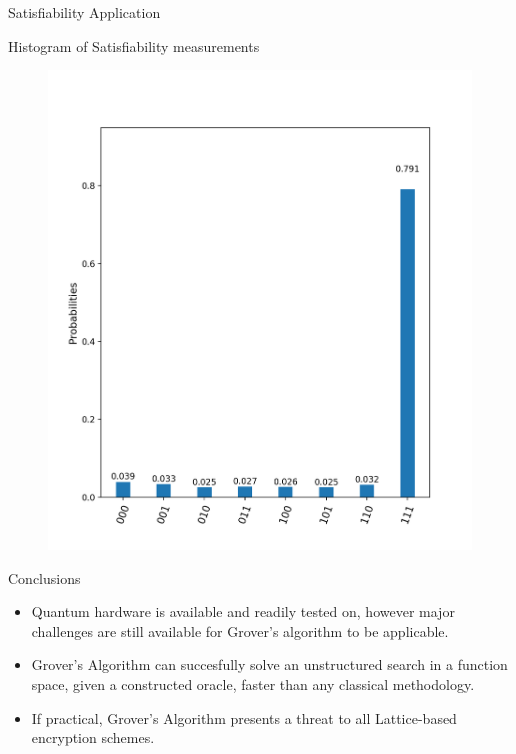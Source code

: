 \documentclass{beamer}
\begin{document}
\begin{frame}{Satisfiability Application}
	\begin{center}
		Histogram of Satisfiability measurements
	\end{center}
	\begin{figure}[Histogram of Satisfiability measurements]
		\centering
		\includegraphics[scale=.34]{./111_histogram.png}
	\end{figure}
\end{frame}




\begin{frame}{Conclusions}
	\begin{itemize}
		\item Quantum hardware is available and readily tested on, however major challenges are still available for Grover's algorithm to be applicable.
		\item Grover's Algorithm can succesfully solve an unstructured search in a function space, given a constructed oracle, faster than any classical methodology.
		\item If practical, Grover's Algorithm presents a threat to all Lattice-based encryption schemes.
	\end{itemize}
\end{frame}
\end{document}
